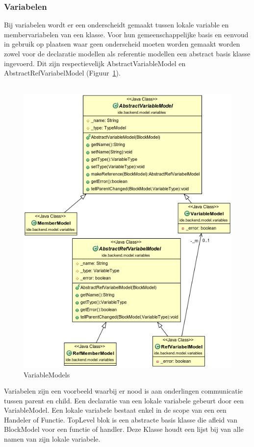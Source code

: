 \documentclass[]{article}
\begin{document}
\subsubsection{Variabelen}
\label{variabelen}
Bij variabelen wordt er een onderscheidt gemaakt tussen lokale variable en membervariabelen van een klasse. Voor hun gemeenschappelijke basis en eenvoud in gebruik op plaatsen waar geen onderscheid moeten worden gemaakt worden zowel voor de declaratie modellen als referentie modellen een abstract basis klasse ingevoerd. Dit zijn respectievelijk AbstractVariableModel en AbstractRefVariabelModel (Figuur~\ref{varModelUML}). \\\\
\begin{figure}[H]
  \centering
\includegraphics[scale=0.4]{AnalyseADTAlgorithm/blockmodel/variablemodels}
  \caption{VariableModels} \label{varModelUML}
\end{figure}
Variabelen zijn een voorbeeld waarbij er nood is aan onderlingen communicatie tussen parent en child. Een declaratie van een lokale variabele gebeurt door een VariableModel. Een lokale variabele bestaat enkel in de scope van een een Handeler of Functie. TopLevel blok is een abstracte basis klasse die afleid van BlockModel voor een functie of handler. Deze Klasse houdt een lijst bij van alle namen van zijn lokale variabele.\\\\
\end{document}
